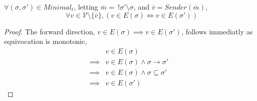 \begin{lemma}
$\forall (\sigma, \sigma') \in Minimal_t$, letting $\overline{m} =~!\sigma'\setminus\sigma$, and $\overline{v} = Sender(\overline{m})$,
$$
\forall v \in \mathcal{V} \setminus \{\overline{v}\}, (v \in E(\sigma) \iff v \in E(\sigma'))
$$
\end{lemma}

\begin{proof}
The forward direction, $v \in E(\sigma) \implies v \in E(\sigma')$, follows immediatly as equivocation is monotonic,
\begin{align}
        &v \in E(\sigma) \\
\implies&v \in E(\sigma) \land \sigma \to \sigma' \\
\implies&v \in E(\sigma) \land \sigma \subseteq \sigma' \\
\implies&v \in E(\sigma')&
\end{align}



\end{proof}
